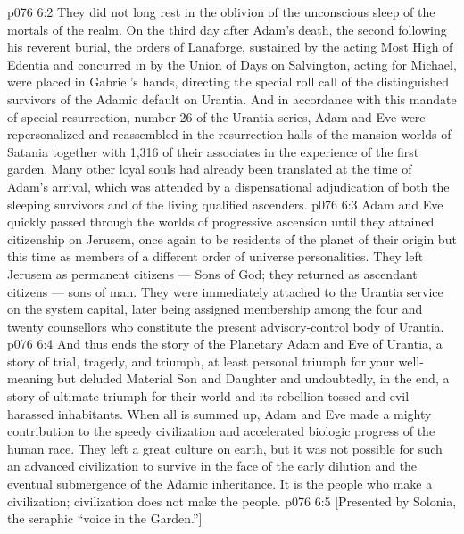 \vs p076 6:2 They did not long rest in the oblivion of the unconscious sleep of the mortals of the realm. On the third day after Adam’s death, the second following his reverent burial, the orders of Lanaforge, sustained by the acting Most High of Edentia and concurred in by the Union of Days on Salvington, acting for Michael, were placed in Gabriel’s hands, directing the special roll call of the distinguished survivors of the Adamic default on Urantia. And in accordance with this mandate of special resurrection, number 26 of the Urantia series, Adam and Eve were repersonalized and reassembled in the resurrection halls of the mansion worlds of Satania together with 1,316 of their associates in the experience of the first garden. Many other loyal souls had already been translated at the time of Adam’s arrival, which was attended by a dispensational adjudication of both the sleeping survivors and of the living qualified ascenders.
\vs p076 6:3 \pc Adam and Eve quickly passed through the worlds of progressive ascension until they attained citizenship on Jerusem, once again to be residents of the planet of their origin but this time as members of a different order of universe personalities. They left Jerusem as permanent citizens --- Sons of God; they returned as ascendant citizens --- sons of man. They were immediately attached to the Urantia service on the system capital, later being assigned membership among the four and twenty counsellors who constitute the present advisory\hyp{}control body of Urantia.
\vs p076 6:4 \pc And thus ends the story of the Planetary Adam and Eve of Urantia, a story of trial, tragedy, and triumph, at least personal triumph for your well\hyp{}meaning but deluded Material Son and Daughter and undoubtedly, in the end, a story of ultimate triumph for their world and its rebellion\hyp{}tossed and evil\hyp{}harassed inhabitants. When all is summed up, Adam and Eve made a mighty contribution to the speedy civilization and accelerated biologic progress of the human race. They left a great culture on earth, but it was not possible for such an advanced civilization to survive in the face of the early dilution and the eventual submergence of the Adamic inheritance. It is the people who make a civilization; civilization does not make the people.
\vsetoff
\vs p076 6:5 [Presented by Solonia, the seraphic “voice in the Garden.”]
\quizlink
